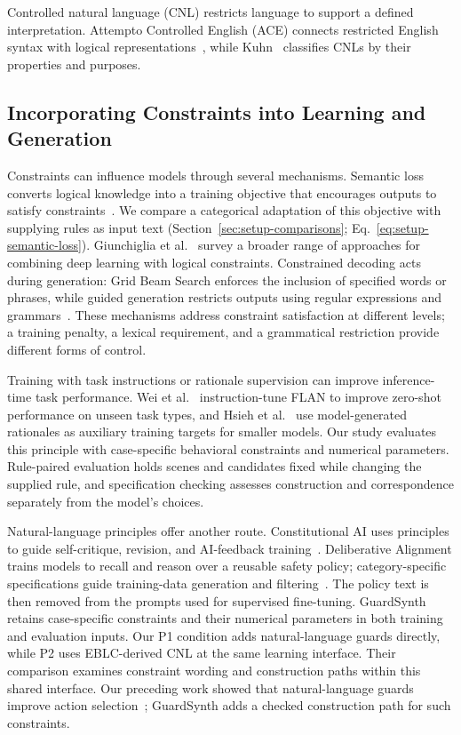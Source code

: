 Controlled natural language (CNL) restricts language to support a
defined interpretation. Attempto Controlled English (ACE) connects
restricted English syntax with logical representations~\cite{r10}, while Kuhn~\cite{r13}
classifies CNLs by their properties and purposes.\par

\subsection{Incorporating Constraints into Learning and Generation}

Constraints can influence models through several mechanisms. Semantic
loss converts logical knowledge into a training objective that
encourages outputs to satisfy constraints~\cite{Xu2018}. We compare a
categorical adaptation of this objective with supplying rules as input text
(Section~\ref{sec:setup-comparisons}; Eq.~\ref{eq:setup-semantic-loss}). Giunchiglia
et al.~\cite{Giunchiglia2022} survey a broader range of approaches for combining deep
learning with logical constraints. Constrained
decoding acts during generation: Grid Beam Search enforces the inclusion
of specified words or phrases, while guided generation restricts outputs
using regular expressions and grammars~\cite{Hokamp2017,Willard2023}.
These mechanisms address constraint satisfaction at different levels;
a training penalty, a lexical requirement, and a grammatical restriction
provide different forms of control.\par

Training with task instructions or rationale supervision can improve
inference-time task performance. Wei et al.~\cite{Wei2022} instruction-tune
FLAN to improve zero-shot performance on unseen task types, and
Hsieh et al.~\cite{Hsieh2023} use model-generated rationales as auxiliary
training targets for smaller models. Our study evaluates this principle with
case-specific behavioral constraints and numerical parameters. Rule-paired
evaluation holds scenes and candidates fixed while changing the supplied rule,
and specification checking assesses construction and correspondence separately
from the model's choices.\par

Natural-language principles offer another route. Constitutional AI
uses principles to guide self-critique, revision, and AI-feedback
training~\cite{Bai2022}. Deliberative Alignment trains models to recall
and reason over a reusable safety policy; category-specific specifications
guide training-data generation and filtering~\cite{Guan2024}. The policy
text is then removed from the prompts used for supervised fine-tuning.
GuardSynth retains case-specific constraints and their numerical parameters
in both training and evaluation inputs. Our P1 condition adds
natural-language guards directly, while P2 uses EBLC-derived CNL at
the same learning interface. Their comparison examines constraint wording and
construction paths within this shared interface. Our preceding work showed
that natural-language guards improve action selection~\cite{r4}; GuardSynth
adds a checked construction path for such constraints.\par

